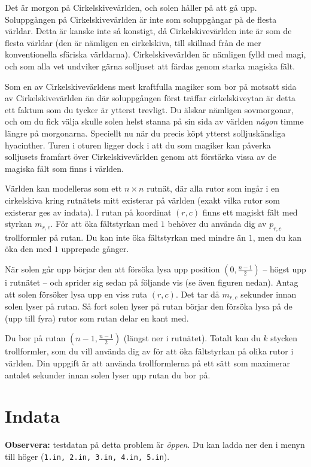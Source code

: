 Det är morgon på Cirkelskivevärlden, och solen håller på att gå upp.
Soluppgången på Cirkelskivevärlden är inte som soluppgångar på de flesta världar.
Detta är kanske inte så konstigt, då Cirkelskivevärlden inte är som de flesta världar (den är nämligen en cirkelskiva, till skillnad från de mer konventionella sfäriska världarna).
Cirkelskivevärlden är nämligen fylld med magi, och som alla vet undviker gärna solljuset att färdas genom starka magiska fält.

Som en av Cirkelskivevärldens mest kraftfulla magiker som bor på motsatt sida av Cirkelskivevärlden än där soluppgången först träffar cirkelskiveytan är detta ett faktum som du tycker är ytterst trevligt.
Du älskar nämligen sovmorgonar, och om du fick välja skulle solen helst stanna på sin sida av världen \emph{någon} timme längre på morgonarna.
Speciellt nu när du precis köpt ytterst solljuskänsliga hyacinther.
Turen i oturen ligger dock i att du som magiker kan påverka solljusets framfart över Cirkelskivevärlden genom att förstärka vissa av de magiska fält som finns i världen.

Världen kan modelleras som ett $n \times n$ rutnät, där alla rutor som ingår i en cirkelskiva kring rutnätets mitt existerar på världen (exakt vilka rutor som existerar ges av indata). 
I rutan på koordinat $(r, c)$ finns ett magiskt fält med styrkan $m_{r, c}$.
För att öka fältstyrkan med $1$ behöver du använda dig av $p_{r, c}$ trollformler på rutan.
Du kan inte öka fältstyrkan med mindre än $1$, men du kan öka den med $1$ upprepade gånger.

När solen går upp börjar den att försöka lysa upp position $(0, \frac{n - 1}{2})$ -- högst upp i rutnätet -- och sprider sig sedan på följande vis (se även figuren nedan).
Antag att solen försöker lysa upp en viss ruta $(r, c)$.
Det tar då $m_{r, c}$ sekunder innan solen lyser på rutan.
Så fort solen lyser på rutan börjar den försöka lysa på de (upp till fyra) rutor som rutan delar en kant med.

Du bor på rutan $(n-1, \frac{n-1}{2})$ (längst ner i rutnätet).
Totalt kan du $k$ stycken trollformler, som du vill använda dig av för att öka fältstyrkan på olika rutor i världen.
Din uppgift är att använda trollformlerna på ett sätt som maximerar antalet sekunder innan solen lyser upp rutan du bor på.

\section*{Indata}
\textbf{Observera:} testdatan på detta problem är \emph{öppen}. Du kan ladda ner den i menyn till höger (\texttt{1.in, 2.in, 3.in, 4.in, 5.in}).

